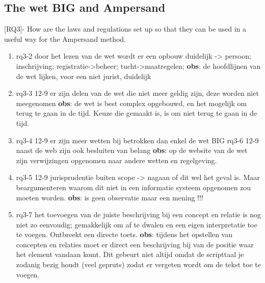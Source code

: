 \def\rq{rq3}



\begin{comment}
RQ3 - Hoe zijn de wet- en regelgeving opgezet zodat ze kunnen worden gebruikt in een bruikbare manier voor de Ampersand-methode.
\end{comment}
\subsection{The wet BIG and Ampersand}
[RQ3]- How are the laws and regulations set up so that they can be used in a useful way for the Ampersand method.
\begin{enumerate}
    \item rq3-2 door het lezen van de wet wordt er een opbouw duidelijk -> persoon; inschrijving; registratie->beheer; tucht->maatregelen; 
    \newline\textbf{obs}: de hoofdlijnen van de wet lijken, voor een niet jurist, duidelijk

    \item rq3-3 12-9 er zijn delen van de wet die niet meer geldig zijn, deze worden niet meegenomen
    \newline\textbf{obs}: de wet is best complex opgebouwd, en het mogelijk om terug te gaan in de tijd.
    Keuze die gemaakt is, is om niet terug te gaan in de tijd.
    
    \item rq3-4 12-9 er zijn meer wetten bij betrokken dan enkel de wet BIG
    \newline rq3-6 12-9 naast de web zijn ook besluiten van belang
    \newline\textbf{obs}: op de website van de wet zijn verwijzingen opgenomen naar andere wetten en regelgeving.
    
    \item rq3-5 12-9 jurisprudentie buiten scope -> nagaan of dit wel het geval is. 
    Maar beargumenteren waarom dit niet in een informatie systeem opgenomen zou moeten worden.
    \newline\textbf{obs}: is geen observatie maar een mening !!!

    \item rq3-7 het toevoegen van de juiste beschrijving bij een concept en relatie is nog niet zo eenvoudig; gemakkelijk om af te dwalen en een eigen interpretatie toe te voegen. 
    Ontbreekt een directe toets.
    \newline\textbf{obs}: tijdens het opstellen van concepten en relaties moet er direct een beschrijving bij van de positie waar het element vandaan komt.
    Dit gebeurt niet altijd omdat de scripttaal je zodanig bezig houdt (veel gepruts) zodat er vergeten wordt om de tekst toe te voegen.
    

\end{enumerate}
